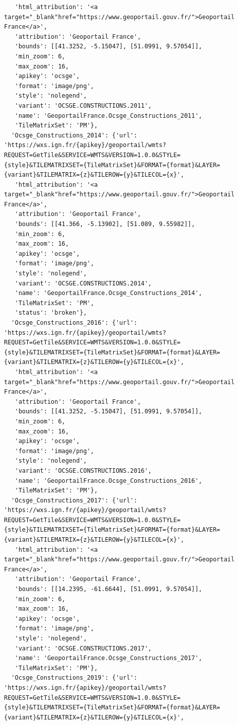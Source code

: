 \documentclass[
  letterpaper,
  DIV=11,
  numbers=noendperiod]{scrreprt}
\begin{document}
\begin{verbatim}
   'html_attribution': '<a target="_blank"href="https://www.geoportail.gouv.fr/">Geoportail France</a>',
   'attribution': 'Geoportail France',
   'bounds': [[41.3252, -5.15047], [51.0991, 9.57054]],
   'min_zoom': 6,
   'max_zoom': 16,
   'apikey': 'ocsge',
   'format': 'image/png',
   'style': 'nolegend',
   'variant': 'OCSGE.CONSTRUCTIONS.2011',
   'name': 'GeoportailFrance.Ocsge_Constructions_2011',
   'TileMatrixSet': 'PM'},
  'Ocsge_Constructions_2014': {'url': 'https://wxs.ign.fr/{apikey}/geoportail/wmts?REQUEST=GetTile&SERVICE=WMTS&VERSION=1.0.0&STYLE={style}&TILEMATRIXSET={TileMatrixSet}&FORMAT={format}&LAYER={variant}&TILEMATRIX={z}&TILEROW={y}&TILECOL={x}',
   'html_attribution': '<a target="_blank"href="https://www.geoportail.gouv.fr/">Geoportail France</a>',
   'attribution': 'Geoportail France',
   'bounds': [[41.366, -5.13902], [51.089, 9.55982]],
   'min_zoom': 6,
   'max_zoom': 16,
   'apikey': 'ocsge',
   'format': 'image/png',
   'style': 'nolegend',
   'variant': 'OCSGE.CONSTRUCTIONS.2014',
   'name': 'GeoportailFrance.Ocsge_Constructions_2014',
   'TileMatrixSet': 'PM',
   'status': 'broken'},
  'Ocsge_Constructions_2016': {'url': 'https://wxs.ign.fr/{apikey}/geoportail/wmts?REQUEST=GetTile&SERVICE=WMTS&VERSION=1.0.0&STYLE={style}&TILEMATRIXSET={TileMatrixSet}&FORMAT={format}&LAYER={variant}&TILEMATRIX={z}&TILEROW={y}&TILECOL={x}',
   'html_attribution': '<a target="_blank"href="https://www.geoportail.gouv.fr/">Geoportail France</a>',
   'attribution': 'Geoportail France',
   'bounds': [[41.3252, -5.15047], [51.0991, 9.57054]],
   'min_zoom': 6,
   'max_zoom': 16,
   'apikey': 'ocsge',
   'format': 'image/png',
   'style': 'nolegend',
   'variant': 'OCSGE.CONSTRUCTIONS.2016',
   'name': 'GeoportailFrance.Ocsge_Constructions_2016',
   'TileMatrixSet': 'PM'},
  'Ocsge_Constructions_2017': {'url': 'https://wxs.ign.fr/{apikey}/geoportail/wmts?REQUEST=GetTile&SERVICE=WMTS&VERSION=1.0.0&STYLE={style}&TILEMATRIXSET={TileMatrixSet}&FORMAT={format}&LAYER={variant}&TILEMATRIX={z}&TILEROW={y}&TILECOL={x}',
   'html_attribution': '<a target="_blank"href="https://www.geoportail.gouv.fr/">Geoportail France</a>',
   'attribution': 'Geoportail France',
   'bounds': [[14.2395, -61.6644], [51.0991, 9.57054]],
   'min_zoom': 6,
   'max_zoom': 16,
   'apikey': 'ocsge',
   'format': 'image/png',
   'style': 'nolegend',
   'variant': 'OCSGE.CONSTRUCTIONS.2017',
   'name': 'GeoportailFrance.Ocsge_Constructions_2017',
   'TileMatrixSet': 'PM'},
  'Ocsge_Constructions_2019': {'url': 'https://wxs.ign.fr/{apikey}/geoportail/wmts?REQUEST=GetTile&SERVICE=WMTS&VERSION=1.0.0&STYLE={style}&TILEMATRIXSET={TileMatrixSet}&FORMAT={format}&LAYER={variant}&TILEMATRIX={z}&TILEROW={y}&TILECOL={x}',

\end{verbatim}
\end{document}
